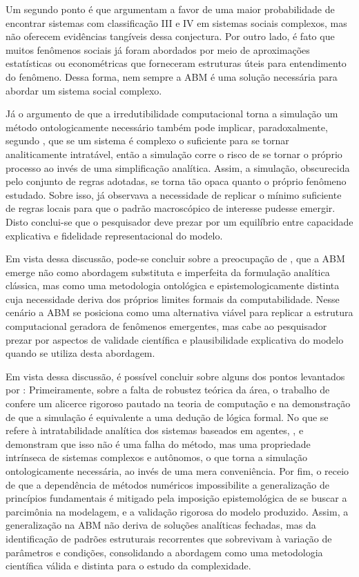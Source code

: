 \documentclass[12pt,oneside,a4paper,brazil,sumario=tradicional]{abntex2}
\begin{document}
Um segundo ponto é que \textcite{namatame2016} argumentam a favor de uma maior probabilidade de encontrar sistemas com classificação III e IV em sistemas sociais complexos, mas não oferecem evidências tangíveis dessa conjectura. Por outro lado, é fato que muitos fenômenos sociais já foram abordados por meio de aproximações estatísticas ou econométricas que forneceram estruturas úteis para entendimento do fenômeno. Dessa forma, nem sempre a ABM é uma solução necessária para abordar um sistema social complexo.

Já o argumento de que a irredutibilidade computacional torna a simulação um método ontologicamente necessário também pode implicar, paradoxalmente, segundo \textcite{wolfram2002}, que se um sistema é complexo o suficiente para se tornar analiticamente intratável, então a simulação corre o risco de se tornar o próprio processo ao invés de uma simplificação analítica. Assim, a simulação, obscurecida pelo conjunto de regras adotadas, se torna tão opaca quanto o próprio fenômeno estudado. Sobre isso, \textcite{epstein1999} já observava a necessidade de replicar o mínimo suficiente de regras locais para que o padrão macroscópico de interesse pudesse emergir. Disto conclui-se que o pesquisador deve prezar por um equilíbrio entre capacidade explicativa e fidelidade representacional do modelo.

Em vista dessa discussão, pode-se concluir sobre a preocupação de \textcite{boccara2004}, que a ABM emerge não como abordagem substituta e imperfeita da formulação analítica clássica, mas como uma metodologia ontológica e epistemologicamente distinta cuja necessidade deriva dos próprios limites formais da computabilidade. Nesse cenário a ABM se posiciona como uma alternativa viável para replicar a estrutura computacional geradora de fenômenos emergentes, mas cabe ao pesquisador prezar por aspectos de validade científica e plausibilidade explicativa do modelo quando se utiliza desta abordagem.

Em vista dessa discussão, é possível concluir sobre alguns dos pontos levantados por \textcite{boccara2004}: Primeiramente, sobre a falta de robustez teórica da área, o trabalho de \textcite{epstein1999} confere um alicerce rigoroso pautado na teoria de computação e na demonstração de que a simulação é equivalente a uma dedução de lógica formal. No que se refere à intratabilidade analítica dos sistemas baseados em agentes, \textcite{namatame2016}, \textcite{wolfram2022} e \textcite{azadi2025} demonstram que isso não é uma falha do método, mas uma propriedade intrínseca de sistemas complexos e autônomos, o que torna a simulação ontologicamente necessária, ao invés de uma mera conveniência.  Por fim, o receio de que a dependência de métodos numéricos impossibilite a generalização de princípios fundamentais é mitigado pela imposição epistemológica de se buscar a parcimônia na modelagem, e a validação rigorosa do modelo produzido. Assim, a generalização na ABM não deriva de soluções analíticas fechadas, mas da identificação de padrões estruturais recorrentes que sobrevivam à variação de parâmetros e condições, consolidando a abordagem como uma metodologia científica válida e distinta para o estudo da complexidade.
\end{document}

